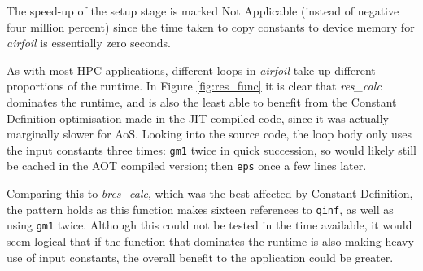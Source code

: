 \begin{figure}[ht]
\begin{center}
{
}
\end{center}
\end{figure}

The speed-up of the setup stage is marked Not Applicable (instead of negative four million percent) since the time taken to copy constants to device memory for \textit{airfoil} is essentially zero seconds.


\noindent As with most HPC applications, different loops in \textit{airfoil} take up different proportions of the runtime. In Figure \ref{fig:res_func} it is clear that \textit{res\_calc} dominates the runtime, and is also the least able to benefit from the Constant Definition optimisation made in the JIT compiled code, since it was actually marginally slower for AoS. Looking into the source code, the loop body only uses the input constants three times: \verb|gm1| twice in quick succession, so would likely still be cached in the AOT compiled version; then \verb|eps| once a few lines later.
\par
Comparing this to \textit{bres\_calc}, which was the best affected by Constant Definition, the pattern holds as this function makes sixteen references to \verb|qinf|, as well as using \verb|gm1| twice. Although this could not be tested in the time available, it would seem logical that if the function that dominates the runtime is also making heavy use of input constants, the overall benefit to the application could be greater.
\par
